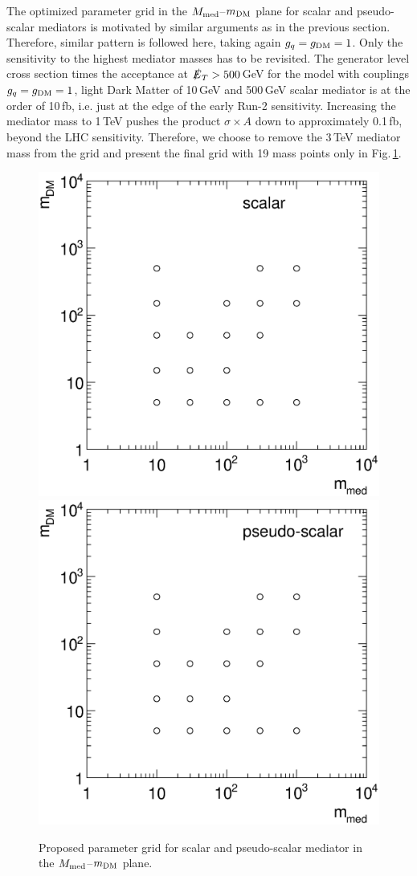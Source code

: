 The optimized parameter grid in the $M_{\rm{med}}$--$m_{\rm{DM}}$ plane for scalar and pseudo-scalar mediators is motivated by similar arguments as in the previous section. Therefore, similar pattern is followed here, taking again $g_q=g_{\rm{DM}}=1$. Only the sensitivity to the highest mediator masses has to be revisited.
The generator level cross section times the acceptance at $\slashed{E}_T>500$\,GeV for the model with couplings $g_q=g_{\rm{DM}}=1$, light Dark Matter of 10\,GeV and 500\,GeV scalar mediator is at the order of 10\,fb, i.e. just at the edge of the early Run-2 sensitivity. Increasing the mediator mass to 1\,TeV pushes the product $\sigma\times A$ down to approximately 0.1\,fb, beyond the LHC sensitivity. Therefore, we choose to remove the 3\,TeV mediator mass from the grid and present the final grid with 19 mass points only in Fig.\,\ref{fig:monojet_grid_S}.

\begin{figure}
\centering
\includegraphics[width=0.45\linewidth]{figures/monojet/grid_S.eps}
\includegraphics[width=0.45\linewidth]{figures/monojet/grid_P.eps}
\caption{Proposed parameter grid for scalar and pseudo-scalar mediator in the $M_{\rm{med}}$--$m_{\rm{DM}}$ plane.}
\label{fig:monojet_grid_S}
\end{figure}

